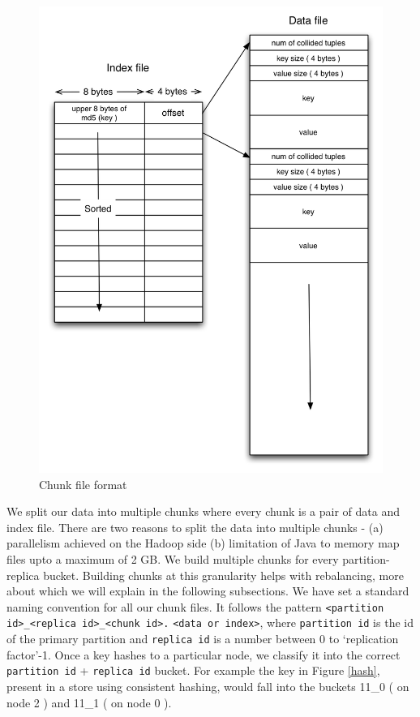 \documentclass[10pt,twocolumn,preprint,natbib,authoryear]{sigplanconf}
\begin{document}
\begin{figure}
  \centering
    \includegraphics[scale=0.45]{storage_format.png}
  \caption{Chunk file format}
  \label{storage_format}
\end{figure}


We split our data into multiple chunks where every chunk is a pair of data and index file. There are two reasons to split the data into multiple chunks - (a) parallelism achieved on the Hadoop side (b) limitation of Java to memory map files upto a maximum of 2 GB. We build multiple chunks for every partition-replica bucket. Building chunks at this granularity helps with rebalancing, more about which we will explain in the following subsections. We have set a standard naming convention for all our chunk files. It follows the pattern \verb=<partition id>_<replica id>_<chunk id>.= \verb=<data or index>=, where \verb=partition id= is the id of the primary partition and \verb=replica id= is a number between 0 to `replication factor'-1. Once a key hashes to a particular node, we classify it into the correct \verb=partition id= + \verb=replica id= bucket. For example the key in Figure \ref{hash}, present in a store using consistent hashing, would fall into the buckets 11\_0 ( on node 2 ) and 11\_1 ( on node 0 ). 
\end{document}
